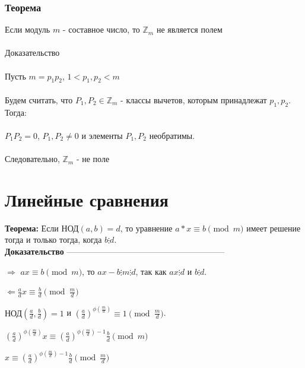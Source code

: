 \documentclass[12pt]{article}
\renewcommand{\gcd}{\text{НОД}}
\begin{document}
            \subsubsection{Теорема}
            Если модуль $m$ - составное число, то $\mathbb{Z}_m$ не является полем\\
            \\
            Доказательство\\
            \\
            Пусть \quad $m = p_1p_2$, \qquad $1 < p_1, p_2 < m$\\
            \\
            Будем считать, что $P_1, P_2 \in \mathbb{Z}_m$ - классы вычетов, которым принадлежат $p_1, p_2$. Тогда:\\
            \\
            \quad $P_1P_2 = 0$, \quad $P_1, P_2 \ne 0$ \quad и элементы $P_1, P_2$ необратимы.\\
            \\
            Следовательно, $\mathbb{Z}_m$ - не поле

            \section{Линейные сравнения}
            \textbf{Теорема:}
            Если $\gcd(a, b) = d$, то уравнение $a*x\equiv b \pmod{m}$ имеет решение тогда и только тогда, когда $b \vdots d$.\\
            \textbf{Доказательство} ---------------------------------------------------------

            \vspace{0.3cm} %

        $\Rightarrow$ $ax \equiv b \pmod{m}$, то $ax - b \vdots m \vdots d$, так как $ax \vdots d$ и $b \vdots d$.

        $\Leftarrow$$\frac{a}{d}x \equiv \frac{b}{d} \pmod{\frac{m}{d}}$

$\gcd\left(\frac{a}{d}, \frac{b}{d}\right) = 1$ и $\left(\frac{a}{d}\right)^{\phi\left(\frac{m}{d}\right)} \equiv 1 \pmod{\frac{m}{d}}$.

        \vspace{0.5cm} %
    $\left(\frac{a}{d}\right)^{\phi\left(\frac{m}{d}\right)} x \equiv \left(\frac{a}{d}\right)^{\phi\left(\frac{m}{d}\right) - 1} \frac{b}{d} \pmod{m}$

        \vspace{0.5cm} %
    $x \equiv \left(\frac{a}{d}\right)^{\phi\left(\frac{m}{d}\right) - 1} \frac{b}{d} \pmod{\frac{m}{d}}$
\end{document}
